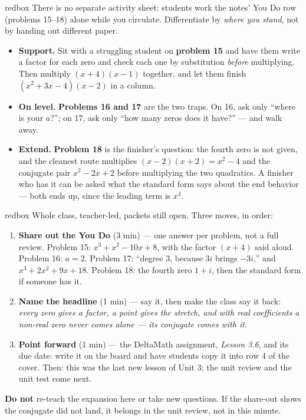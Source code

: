 \documentclass[10pt]{article}
\begin{document}
\begin{skillbox}{redbox}
There is no separate activity sheet: students work the notes' You Do row (problems 15--18)
alone while you circulate. Differentiate by \textit{where you stand}, not by handing out
different paper.

\begin{itemize}
  \item \textbf{Support.} Sit with a struggling student on \textbf{problem 15} and have them
        write a factor for each zero and check each one by substitution \emph{before}
        multiplying. Then multiply $(x + 4)(x - 1)$ together, and let them finish
        $(x^2 + 3x - 4)(x - 2)$ in a column.
  \item \textbf{On level.} \textbf{Problems 16 and 17} are the two traps. On 16, ask only
        ``where is your $a$?''; on 17, ask only ``how many zeros does it have?'' --- and walk
        away.
  \item \textbf{Extend.} \textbf{Problem 18} is the finisher's question: the fourth zero is not
        given, and the cleanest route multiplies $(x - 2)(x + 2) = x^2 - 4$ and the conjugate
        pair $x^2 - 2x + 2$ before multiplying the two quadratics. A finisher who has it can
        be asked what the standard form says about the end behavior --- both ends up, since
        the leading term is $x^4$.
\end{itemize}
\end{skillbox}

\boxguard[20]
\begin{skillbox}{redbox}
Whole class, teacher-led, packets still open. Three moves, in order:
\begin{enumerate}[itemsep=3pt]
  \item \textbf{Share out the You Do} (3 min) --- one answer per problem, not a full review.
        Problem 15: $x^3 + x^2 - 10x + 8$, with the factor $(x + 4)$ said aloud. Problem 16:
        $a = 2$. Problem 17: ``degree 3, because $3i$ brings $-3i$,'' and
        $x^3 + 2x^2 + 9x + 18$. Problem 18: the fourth zero $1 + i$, then the standard form if
        someone has it.
  \item \textbf{Name the headline} (1 min) --- say it, then make the class say it back:
        \textit{every zero gives a factor, a point gives the stretch, and with real
        coefficients a non-real zero never comes alone --- its conjugate comes with it.}
  \item \textbf{Point forward} (1 min) --- the DeltaMath assignment, \textit{Lesson 3.6}, and its
        due date: write it on the board and have students copy it into row 4 of the cover.
        Then: this was the last new lesson of Unit 3; the unit review and the unit test come
        next.
\end{enumerate}
\textbf{Do not} re-teach the expansion here or take new questions. If the share-out shows the
conjugate did not land, it belongs in the unit review, not in this minute.
\end{skillbox}
\end{document}
